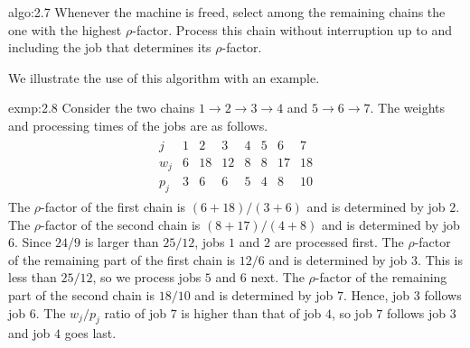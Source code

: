 \begin{algo}{algo:2.7}
    Whenever the machine is freed, select among the remaining chains the one 
    with the highest $\rho$-factor. Process this chain without interruption 
    up to and including the job that determines its $\rho$-factor.
\end{algo}

We illustrate the use of this algorithm with an example. 

\begin{exmp}{exmp:2.8}
    Consider the two chains $1 \to 2 \to 3 \to 4$ and $5 \to 6 \to 7$. 
    The weights and processing times of the jobs are as follows. 
    \begin{align*}
        \begin{array}{c|ccccccc}
        j   & 1 & 2  & 3  & 4 & 5 & 6  & 7  \\ \hline
        w_j & 6 & 18 & 12 & 8 & 8 & 17 & 18 \\
        p_j & 3 & 6  & 6  & 5 & 4 & 8  & 10
        \end{array}
    \end{align*}
    The $\rho$-factor of the first chain is $(6+18)/(3+6)$ and is determined 
    by job $2$. The $\rho$-factor of the second chain is $(8+17)/(4+8)$ and 
    is determined by job $6$. Since $24/9$ is larger than $25/12$, jobs 
    $1$ and $2$ are processed first. The $\rho$-factor of the remaining 
    part of the first chain is $12/6$ and is determined by job $3$. This is 
    less than $25/12$, so we process jobs $5$ and $6$ next. The $\rho$-factor 
    of the remaining part of the second chain is $18/10$ and is determined by 
    job $7$. Hence, job $3$ follows job $6$. The $w_j/p_j$ ratio of job $7$ 
    is higher than that of job $4$, so job $7$ follows job $3$ and job $4$ 
    goes last. 
\end{exmp}